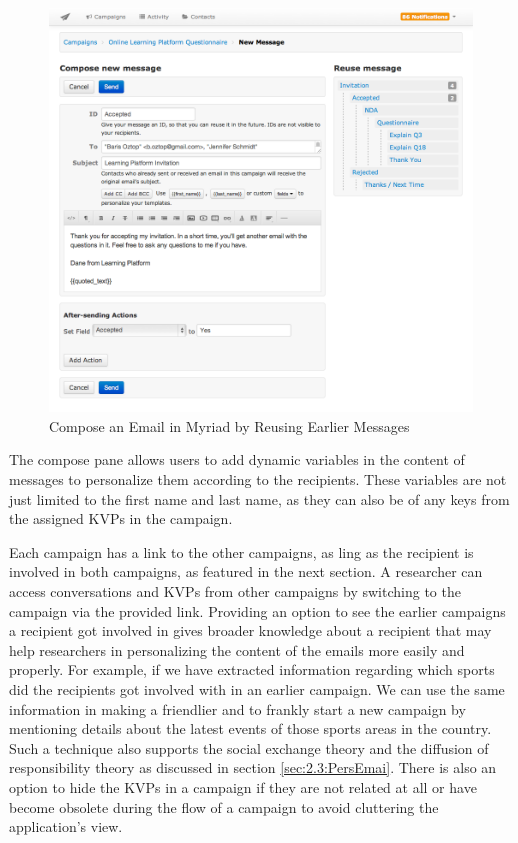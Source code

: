 \begin{figure}[htbp]
	\centering
	\includegraphics[width=1.00\textwidth]{imgs/ComposeEmail.png}
	\caption[Compose an Email in Myriad by Reusing Earlier Messages]{Compose an Email in Myriad by Reusing Earlier Messages}
	\label{fig:ComposeEmail}
\end{figure}

The compose pane allows users to add dynamic variables in the content of messages to personalize them according to the recipients. These variables are not just limited to the first name and last name, as they can also be of any keys from the assigned \ac{KVP}s in the campaign.
\vspace{1cm}

\clearpage

Each campaign has a link to the other campaigns, as ling as the recipient is involved in both campaigns, as featured in the next section. A researcher can access conversations and \ac{KVP}s from other campaigns by switching to the campaign via the provided link. Providing an option to see the earlier campaigns a recipient got involved in gives broader knowledge about a recipient that may help researchers in personalizing the content of the emails more easily and properly. For example, if we have extracted information regarding which sports did the recipients got involved with in an earlier campaign. We can use the same information in making a friendlier and to frankly start a new campaign by mentioning details about the latest events of those sports areas in the country. Such a technique also supports the social exchange theory and the diffusion of responsibility theory as discussed in section \ref{sec:2.3:PersEmai}. There is also an option to hide the \ac{KVP}s in a campaign if they are not related at all or have become obsolete during the flow of a campaign to avoid cluttering the application's view.
\vspace{1cm}

